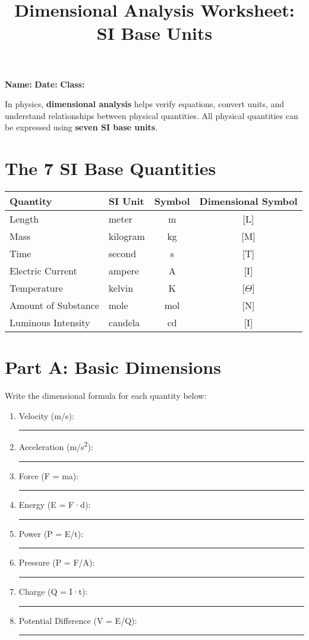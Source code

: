 \documentclass[12pt]{article}
\title{Dimensional Analysis Worksheet: SI Base Units}
\author{}
\date{}
\begin{document}
	
	\maketitle
	\vspace{-5cm}
	\noindent\textbf{Name:} \hrulefill \hfill \textbf{Date:} \hrulefill \hfill \textbf{Class:} \hrulefill
	

\vspace{1.75cm}

	In physics, \textbf{dimensional analysis} helps verify equations, convert units, and understand relationships between physical quantities. All physical quantities can be expressed using \textbf{seven SI base units}.
	
	\section*{The 7 SI Base Quantities}
	
	
	\begin{tabular}{| l | l | c | c |}
		\hline
		\textbf{Quantity} & \textbf{SI Unit} & \textbf{Symbol} & \textbf{Dimensional Symbol} \\
		\hline
		Length & meter & m & [L] \\
		Mass & kilogram & kg & [M] \\
		Time & second & s & [T] \\
		Electric Current & ampere & A & [I] \\
		Temperature & kelvin & K & [\(\Theta\)] \\
		Amount of Substance & mole & mol & [N] \\
		Luminous Intensity & candela & cd & [I] \\
		\hline
	\end{tabular}
	
	\section*{Part A: Basic Dimensions}
	Write the dimensional formula for each quantity below:
	
	\begin{enumerate}
		\item Velocity (m/s): \rule{5cm}{0.4pt}
		\item Acceleration (m/s\textsuperscript{2}): \rule{5cm}{0.4pt}
		\item Force (F = ma): \rule{5cm}{0.4pt}
		\item Energy (E = F·d): \rule{5cm}{0.4pt}
		\item Power (P = E/t): \rule{5cm}{0.4pt}
		\item Pressure (P = F/A): \rule{5cm}{0.4pt}
		\item Charge (Q = I·t): \rule{5cm}{0.4pt}
		\item Potential Difference (V = E/Q): \rule{5cm}{0.4pt}
	\end{enumerate}
	
\end{document}

